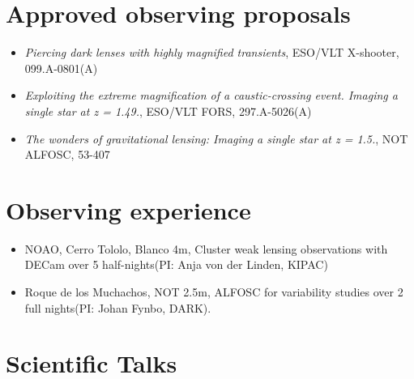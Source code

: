 \documentclass[12pt,letterpaper]{article}
\begin{document}
\section*{Approved observing proposals}

	\begin{itemize}
    \item {\it Piercing dark lenses with highly magnified transients}, ESO/VLT X-shooter,  099.A-0801(A)
    \item {\it Exploiting the extreme magnification of a caustic-crossing event. Imaging a single star at z = 1.49.}, ESO/VLT FORS,  297.A-5026(A)
    \item {\it The wonders of gravitational lensing: Imaging a single star at z = 1.5.}, NOT ALFOSC,  53-407
	\end{itemize}

\section*{Observing experience}

\begin{itemize}
	\item NOAO, Cerro Tololo, Blanco 4m, Cluster weak lensing observations with DECam over 5 half-nights(PI: Anja von der Linden, KIPAC)
	\item Roque de los Muchachos, NOT 2.5m, ALFOSC for variability studies over 2 full nights(PI: Johan Fynbo, DARK).
\end{itemize}


\section*{Scientific Talks}
\end{document}
